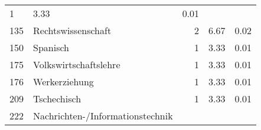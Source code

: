 \begin{longtable}{lXrrr}
       \num{1} &
       \num[round-mode=places,round-precision=2]{3,33} &
         \num[round-mode=places,round-precision=2]{0,01} \\

     135 &
     \multicolumn{1}{X}{ Rechtswissenschaft   } &


       \num{2} &
       \num[round-mode=places,round-precision=2]{6,67} &
         \num[round-mode=places,round-precision=2]{0,02} \\

     150 &
     \multicolumn{1}{X}{ Spanisch   } &


       \num{1} &
       \num[round-mode=places,round-precision=2]{3,33} &
         \num[round-mode=places,round-precision=2]{0,01} \\

     175 &
     \multicolumn{1}{X}{ Volkswirtschaftslehre   } &


       \num{1} &
       \num[round-mode=places,round-precision=2]{3,33} &
         \num[round-mode=places,round-precision=2]{0,01} \\

     176 &
     \multicolumn{1}{X}{ Werkerziehung   } &


       \num{1} &
       \num[round-mode=places,round-precision=2]{3,33} &
         \num[round-mode=places,round-precision=2]{0,01} \\

     209 &
     \multicolumn{1}{X}{ Tschechisch   } &


       \num{1} &
       \num[round-mode=places,round-precision=2]{3,33} &
         \num[round-mode=places,round-precision=2]{0,01} \\

     222 &
     \multicolumn{1}{X}{ Nachrichten-/Informationstechnik   } &



\end{longtable}
